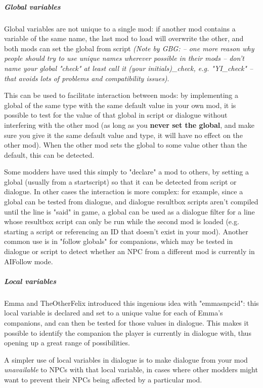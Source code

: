 \documentclass[
]{article}
\begin{document}
\hypertarget{global-variables-1}{%
\subparagraph{Global variables}\label{global-variables-1}}

Global variables are not unique to a single mod: if another mod contains
a variable of the same name, the last mod to load will overwrite the
other, and both mods can set the global from script \emph{(Note by GBG:
-- one more reason why people should try to use unique names wherever
possible in their mods -- don't name your global "check" at least call
it (your initials)\_check, e.g. "YI\_check" -- that avoids lots of
problems and compatibility issues)}.

This can be used to facilitate interaction between mods: by implementing
a global of the same type with the same default value in your own mod,
it is possible to test for the value of that global in script or
dialogue without interfering with the other mod (as long as you
\textbf{never set the global}, and make sure you give it the same
default value and type, it will have no effect on the other mod). When
the other mod sets the global to some value other than the default, this
can be detected.

Some modders have used this simply to "declare" a mod to others, by
setting a global (usually from a startscript) so that it can be detected
from script or dialogue. In other cases the interaction is more complex:
for example, since a global can be tested from dialogue, and dialogue
resultbox scripts aren't compiled until the line is "said" in game, a
global can be used as a dialogue filter for a line whose resultbox
script can only be run while the second mod is loaded (e.g. starting a
script or referencing an ID that doesn't exist in your mod). Another
common use is in "follow globals" for companions, which may be tested in
dialogue or script to detect whether an NPC from a different mod is
currently in AIFollow mode.

\hypertarget{local-variables-1}{%
\subparagraph{Local variables}\label{local-variables-1}}

Emma and TheOtherFelix introduced this ingenious idea with "emmasnpcid":
this local variable is declared and set to a unique value for each of
Emma's companions, and can then be tested for those values in dialogue.
This makes it possible to identify the companion the player is currently
in dialogue with, thus opening up a great range of possibilities.

A simpler use of local variables in dialogue is to make dialogue from
your mod \emph{unavailable} to NPCs with that local variable, in cases
where other modders might want to prevent their NPCs being affected by a
particular mod.
\end{document}
